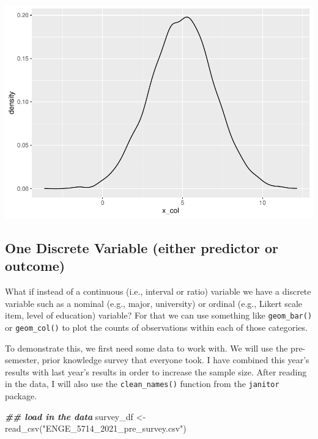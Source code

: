 \documentclass[
]{book}
\newenvironment{Shaded}{\begin{snugshade}}{\end{snugshade}}
\newcommand{\DocumentationTok}[1]{\textcolor[rgb]{0.56,0.35,0.01}{\textbf{\textit{#1}}}}
\newcommand{\FunctionTok}[1]{\textcolor[rgb]{0.00,0.00,0.00}{#1}}
\newcommand{\NormalTok}[1]{#1}
\newcommand{\OtherTok}[1]{\textcolor[rgb]{0.56,0.35,0.01}{#1}}
\newcommand{\StringTok}[1]{\textcolor[rgb]{0.31,0.60,0.02}{#1}}
\begin{document}
\includegraphics{test_course_notes_files/figure-latex/unnamed-chunk-30-1.pdf}

\hypertarget{one-discrete-variable-either-predictor-or-outcome}{%
\subsection{One Discrete Variable (either predictor or outcome)}\label{one-discrete-variable-either-predictor-or-outcome}}

What if instead of a continuous (i.e., interval or ratio) variable we have a discrete variable such as a nominal (e.g., major, university) or ordinal (e.g., Likert scale item, level of education) variable? For that we can use something like \texttt{geom\_bar()} or \texttt{geom\_col()} to plot the counts of observations within each of those categories.

To demonstrate this, we first need some data to work with. We will use the pre-semester, prior knowledge survey that everyone took. I have combined this year's results with last year's results in order to increase the sample size. After reading in the data, I will also use the \texttt{clean\_names()} function from the \texttt{janitor} package.

\begin{Shaded}
\begin{Highlighting}[]
\DocumentationTok{\#\# load in the data}
\NormalTok{survey\_df }\OtherTok{\textless{}{-}} \FunctionTok{read\_csv}\NormalTok{(}\StringTok{"ENGE\_5714\_2021\_pre\_survey.csv"}\NormalTok{)}
\end{Highlighting}
\end{Shaded}
\end{document}
